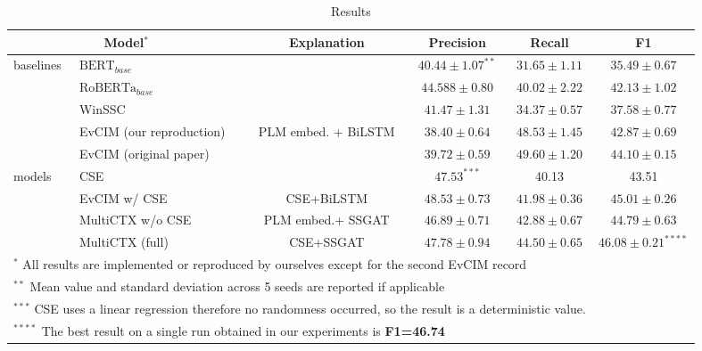 \begin{table*}[htbp]
  \centering
    \begin{tabular}{l|l|cccc}
    \toprule
     \multicolumn{2}{c}{ \textbf{Model$^{*}$}} & \textbf{Explanation} & \textbf{Precision} & \textbf{Recall} & \textbf{F1} \\
    \midrule
    \multirow{5}{*}{baselines} & $\text{BERT}_{base}$  &  & $40.44 \pm 1.07^{**}$ & $31.65\pm1.11$& $35.49\pm 0.67$ \\ \cline{2-6}
    &$\text{RoBERTa}_{base}$ & & $44.588\pm0.80$ & $40.02 \pm 2.22$    & $42.13 \pm 1.02$ \\  \cline{2-6}
    &WinSSC & &$41.47\pm1.31$& $34.37\pm 0.57$  & $37.58 \pm 0.77$ \\ \cline{2-6}
    &EvCIM (our reproduction)
     &  \multirow{2}{*}{PLM embed. + BiLSTM} & $38.40 \pm 0.64$   & $48.53\pm 1.45$& $42.87 \pm 0.69$ \\
    &EvCIM (original paper)
      &  & $39.72\pm 0.59$ &  $49.60 \pm 1.20$ & $44.10\pm 0.15$ \\ \hline
    \multirow{4}{1cm}{models}&CSE   &  & $47.53^{***}$     & 40.13     & 43.51  \\ \cline{2-6}
    &EvCIM w/ CSE & CSE+BiLSTM &$48.53 \pm 0.73$     & $41.98\pm 0.36$    & $45.01 \pm 0.26$\\ \cline{2-6}
    &MultiCTX w/o CSE & PLM embed.+ SSGAT &   $46.89 \pm 0.71$  &  $42.88\pm 0.67$   & $44.79 \pm 0.63$ \\ \cline{2-6}
    &MultiCTX (full) & CSE+SSGAT &  $47.78 \pm 0.94$   &  $44.50 \pm 0.65$   & $\mathbf{46.08 \pm 0.21}^{****}$ \\
    \bottomrule
    \multicolumn{5}{l}{$^{*}$  All results are implemented or reproduced by ourselves except for the second EvCIM record} &\\
    \multicolumn{5}{l}{$^{**}$  Mean value and standard deviation across 5 seeds are reported if applicable} & \\
    \multicolumn{5}{l}{$^{***}$ CSE uses a linear regression therefore no randomness occurred, so the result is a deterministic value.}&\\
    \multicolumn{6}{l}{$^{****}$  The best result on a single run obtained in our experiments is \textbf{F1=46.74}} \\

    \end{tabular}%
  \caption{ Results}
  \label{tab:res}%
\end{table*}%

